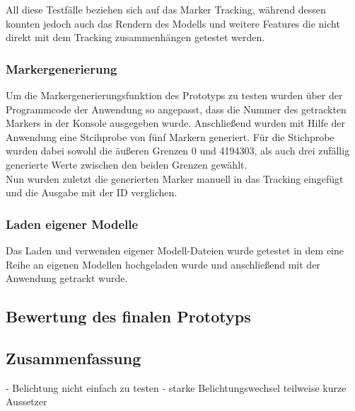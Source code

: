 All diese Testfälle beziehen sich auf das Marker Tracking, während dessen konnten jedoch auch das Rendern des Modells und weitere Features die nicht direkt mit dem Tracking zusammenhängen getestet werden.\\

\subsubsection{Markergenerierung}
Um die Markergenerierungsfunktion des Prototyps zu testen wurden über der Programmcode der Anwendung so angepasst, dass die Nummer des getrackten Markers in der Konsole ausgegeben wurde. Anschließend wurden mit Hilfe der Anwendung eine Stcihprobe von fünf Markern generiert. Für die Stichprobe wurden dabei sowohl die äußeren Grenzen 0 und 4194303, als auch drei zufällig generierte Werte zwischen den beiden Grenzen gewählt.\\
Nun wurden zuletzt die generierten Marker manuell in das Tracking eingefügt und die Ausgabe mit der ID verglichen.

\subsubsection{Laden eigener Modelle}
Das Laden und verwenden eigener Modell-Dateien wurde getestet in dem eine Reihe an eigenen Modellen hochgeladen wurde und anschließend mit der Anwendung getrackt wurde.

\subsection{Bewertung des finalen Prototyps}




\subsection{Zusammenfassung}\label{sec:Zusammenfassung}
- Belichtung nicht einfach zu testen
- starke Belichtungswechsel teilweise kurze Aussetzer

